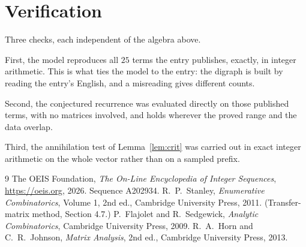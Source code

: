 \documentclass[11pt,a4paper]{article}
\theoremstyle{plain}
\theoremstyle{definition}
\begin{document}
\section{Verification}

Three checks, each independent of the algebra above.

First, the model reproduces all $25$ terms the entry publishes, exactly, in integer
arithmetic. This is what ties the model to the entry: the digraph is built by reading the
entry's English, and a misreading gives different counts.

Second, the conjectured recurrence was evaluated directly on those published terms, with no
matrices involved, and holds wherever the proved range and the data overlap.

Third, the annihilation test of Lemma~\ref{lem:crit} was carried out in exact integer
arithmetic on the whole vector rather than on a sampled prefix.

\begin{thebibliography}{9}
 The OEIS Foundation, \emph{The On-Line Encyclopedia of Integer
Sequences}, \url{https://oeis.org}, 2026. Sequence A202934.
 R.~P.~Stanley, \emph{Enumerative Combinatorics}, Volume 1, 2nd ed.,
Cambridge University Press, 2011. (Transfer-matrix method, Section 4.7.)
 P.~Flajolet and R.~Sedgewick, \emph{Analytic Combinatorics}, Cambridge
University Press, 2009.
 R.~A.~Horn and C.~R.~Johnson, \emph{Matrix Analysis}, 2nd ed., Cambridge
University Press, 2013.
\end{thebibliography}
\end{document}
